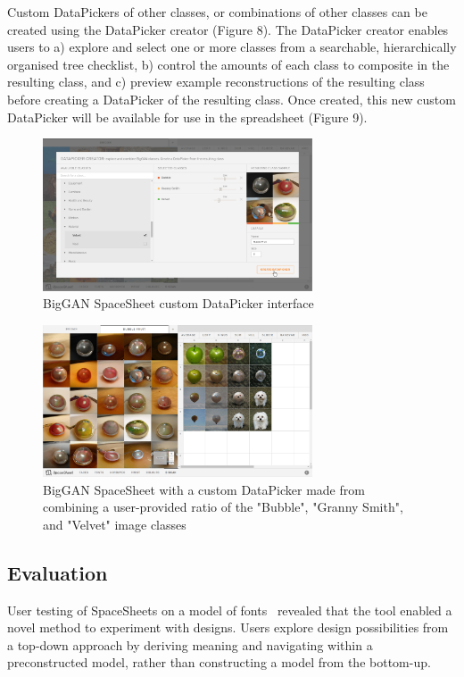 \documentclass[letterpaper]{article}
\begin{document}
Custom DataPickers of other classes, or combinations of other classes can be created using the DataPicker creator (Figure 8). The DataPicker creator enables users to a) explore and select one or more classes from a searchable, hierarchically organised tree checklist, b) control the amounts of each class to composite in the resulting class, and c) preview example reconstructions of the resulting class before creating a DataPicker of the resulting class. Once created, this new custom DataPicker will be available for use in the spreadsheet (Figure 9).

\begin{figure}[ht]
  \centering
  \includegraphics[width=8cm]{figs/BigGAN-02.png}
  \caption{BigGAN SpaceSheet custom DataPicker interface}
\end{figure}

\begin{figure}[ht]
  \centering
  \includegraphics[width=8cm]{figs/BigGAN-03.png}
  \caption{BigGAN SpaceSheet with a custom DataPicker made from combining a user-provided ratio of the "Bubble", "Granny Smith", and "Velvet" image classes}
\end{figure}

\subsection{Evaluation}

User testing of SpaceSheets on a model of fonts~\cite{loh18} revealed that the tool enabled a novel method to experiment with designs. Users explore design possibilities from a top-down approach by deriving meaning and navigating within a preconstructed model, rather than constructing a model from the bottom-up.
\end{document}
